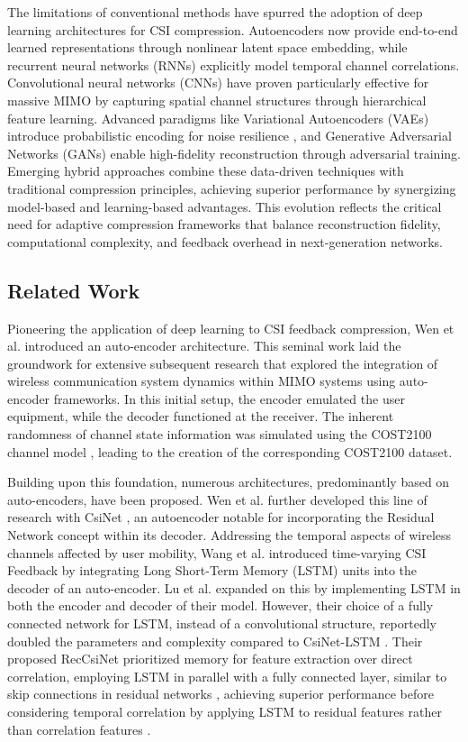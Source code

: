 \documentclass[lettersize,journal]{IEEEtran}
\begin{document}
The limitations of conventional methods have spurred the adoption of deep learning architectures for CSI compression. Autoencoders now provide end-to-end learned representations through nonlinear latent space embedding, while recurrent neural networks (RNNs) \cite{abh} explicitly model temporal channel correlations. Convolutional neural networks (CNNs) have proven particularly effective for massive MIMO by capturing spatial channel structures through hierarchical feature learning. Advanced paradigms like Variational Autoencoders (VAEs) introduce probabilistic encoding for noise resilience \cite{DBLP:journals/corr/abs-2011-04178}, and Generative Adversarial Networks (GANs) \cite{9169908} enable high-fidelity reconstruction through adversarial training. Emerging hybrid approaches combine these data-driven techniques with traditional compression principles, achieving superior performance by synergizing model-based and learning-based advantages. This evolution reflects the critical need for adaptive compression frameworks that balance reconstruction fidelity, computational complexity, and feedback overhead in next-generation networks.


\subsection{Related Work}
Pioneering the application of deep learning to CSI feedback compression, Wen et al. \cite{abe} introduced an auto-encoder architecture. This seminal work laid the groundwork for extensive subsequent research that explored the integration of wireless communication system dynamics within MIMO systems using auto-encoder frameworks. In this initial setup, the encoder emulated the user equipment, while the decoder functioned at the receiver. The inherent randomness of channel state information was simulated using the COST2100 channel model \cite{abf}, leading to the creation of the corresponding COST2100 dataset.

Building upon this foundation, numerous architectures, predominantly based on auto-encoders, have been proposed. Wen et al. further developed this line of research with CsiNet \cite{abe}, an autoencoder notable for incorporating the Residual Network concept \cite{abg} within its decoder. Addressing the temporal aspects of wireless channels affected by user mobility, Wang et al. \cite{abh} introduced time-varying CSI Feedback by integrating Long Short-Term Memory (LSTM) units into the decoder of an auto-encoder. Lu et al. \cite{abi} expanded on this by implementing LSTM in both the encoder and decoder of their model. However, their choice of a fully connected network for LSTM, instead of a convolutional structure, reportedly doubled the parameters and complexity compared to CsiNet-LSTM \cite{abh}. Their proposed RecCsiNet \cite{abi} prioritized memory for feature extraction over direct correlation, employing LSTM in parallel with a fully connected layer, similar to skip connections in residual networks \cite{abi}, achieving superior performance before considering temporal correlation by applying LSTM to residual features rather than correlation features \cite{abh}.
\end{document}

